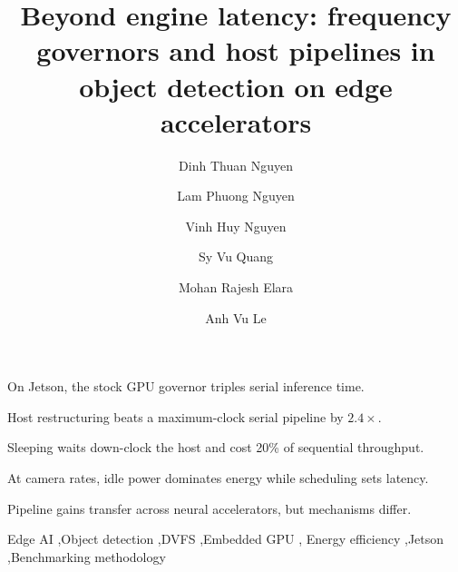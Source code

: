 \documentclass[a4paper,fleqn]{cas-dc}
\begin{document}
\title[mode=title]{Beyond engine latency: frequency governors and host
pipelines in object detection on edge accelerators}

\author[mymainaddress]{Dinh Thuan Nguyen}
\author[mymainaddress]{Lam Phuong Nguyen}
\author[mysecondaryaddress]{Vinh Huy Nguyen}
\author[mythirdaddress]{Sy Vu Quang}
\author[fourthaddress]{Mohan Rajesh Elara}
\author[mythirdaddress]{Anh Vu Le}

\address[mymainaddress]{Faculty of Electrical and Electronics Engineering, Ton Duc Thang University, Ho Chi Minh City, Vietnam}
\address[mysecondaryaddress]{Center of Visualization and Simulation, Duy Tan University, Da Nang, Vietnam}
\address[mythirdaddress]{Advanced Intelligent Technology Research Group, Faculty of Electrical and Electronics Engineering, Ton Duc Thang University, 19 Nguyen Huu Tho Street, Tan Phong Ward, District 7, Ho Chi Minh City 700000, Vietnam}
\address[fourthaddress]{ROAR Lab, Engineering Product Development, Singapore University of Technology and Design, Singapore}



\begin{highlights}
\item On Jetson, the stock GPU governor triples serial inference time.
\item Host restructuring beats a maximum-clock serial pipeline by $2.4\times$.
\item Sleeping waits down-clock the host and cost 20\% of sequential throughput.
\item At camera rates, idle power dominates energy while scheduling sets latency.
\item Pipeline gains transfer across neural accelerators, but mechanisms differ.
\end{highlights}

\begin{keywords}
Edge AI \sep Object detection \sep DVFS \sep Embedded GPU \sep
Energy efficiency \sep Jetson \sep Benchmarking methodology
\end{keywords}
\end{document}
